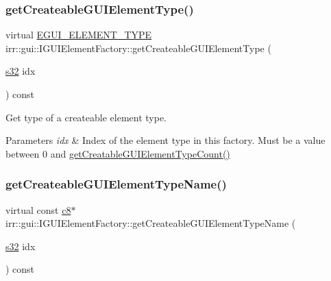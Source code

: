 \subsubsection{\texorpdfstring{get\+Createable\+G\+U\+I\+Element\+Type()}{getCreateableGUIElementType()}\hspace{0.1cm}{\footnotesize\ttfamily [2/2]}}
{\footnotesize\ttfamily virtual \hyperlink{namespaceirr_1_1gui_ae4d66df0ecf4117cdbcf9f22404bd254}{E\+G\+U\+I\+\_\+\+E\+L\+E\+M\+E\+N\+T\+\_\+\+T\+Y\+PE} irr\+::gui\+::\+I\+G\+U\+I\+Element\+Factory\+::get\+Createable\+G\+U\+I\+Element\+Type (\begin{DoxyParamCaption}\item[{\hyperlink{namespaceirr_ac66849b7a6ed16e30ebede579f9b47c6}{s32}}]{idx }\end{DoxyParamCaption}) const\hspace{0.3cm}{\ttfamily [pure virtual]}}



Get type of a createable element type. 


\begin{DoxyParams}{Parameters}
{\em idx} & Index of the element type in this factory. Must be a value between 0 and \hyperlink{classirr_1_1gui_1_1IGUIElementFactory_aae56378de5264978e70d11a36fff02e9}{get\+Creatable\+G\+U\+I\+Element\+Type\+Count()} \\
\hline
\end{DoxyParams}
\mbox{\label{classirr_1_1gui_1_1IGUIElementFactory_aa8007c17ea40b74666c1d04c9d4de85f}} 
\subsubsection{\texorpdfstring{get\+Createable\+G\+U\+I\+Element\+Type\+Name()}{getCreateableGUIElementTypeName()}\hspace{0.1cm}{\footnotesize\ttfamily [1/4]}}
{\footnotesize\ttfamily virtual const \hyperlink{namespaceirr_a9395eaea339bcb546b319e9c96bf7410}{c8}$\ast$ irr\+::gui\+::\+I\+G\+U\+I\+Element\+Factory\+::get\+Createable\+G\+U\+I\+Element\+Type\+Name (\begin{DoxyParamCaption}\item[{\hyperlink{namespaceirr_ac66849b7a6ed16e30ebede579f9b47c6}{s32}}]{idx }\end{DoxyParamCaption}) const\hspace{0.3cm}{\ttfamily [pure virtual]}}



